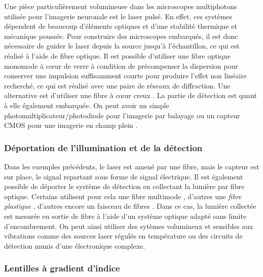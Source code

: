 Une pièce particulièrement volumineuse dans les microscopes multiphotons utilisée pour l'imagerie neuronale est le laser pulsé. En effet, ces systèmes dépendent de beaucoup d'éléments optiques et d'une stabilité thermique et mécanique poussée. Pour construire des microscopes embarqués, il est donc nécessaire de guider le laser depuis la source jusqu'à l'échantillon, ce qui est réalisé à l'aide de fibre optique. Il est possible d'utiliser une fibre optique monomode à cœur de verre \cite{helmchen_miniature_2001} \cite{sawinski_visually_2009} \cite{zong_fast_2017} à condition de précompenser la dispersion pour conserver une impulsion suffisamment courte pour produire l'effet non linéaire recherché, ce qui est réalisé avec une paire de réseaux de diffraction. Une alternative est d'utiliser une fibre à cœur creux \cite{tai_two-photon_2004} \cite{choi_improving_2014} \cite{piyawattanametha_vivo_2009} \cite{klioutchnikov_three-photon_2020}.
La partie de détection est quant à elle également embarquée. On peut avoir un simple photomultiplicateur/photodiode pour l'imagerie par balayage \cite{helmchen_miniature_2001} ou un capteur CMOS pour une imagerie en champ plein \cite{scott_imaging_2018}.

\subsubsection{Déportation de l'illumination et de la détection}

Dans les exemples précédents, le laser est amené par une fibre, mais le capteur est sur place, le signal repartant sous forme de signal électrique. Il est également possible de déporter le système de détection en collectant la lumière par fibre optique. Certains utilisent pour cela une fibre multimode \cite{piyawattanametha_vivo_2009} \cite{sawinski_visually_2009}, d'autres une \emph{fibre plastique} \cite{klioutchnikov_three-photon_2020}, d'autres encore un faisceau de fibres \cite{zong_fast_2017}. Dans ce cas, la lumière collectée est mesurée en sortie de fibre à l'aide d'un système optique adapté sans limite d'encombrement. On peut ainsi utiliser des sytèmes volumineux et sensibles aux vibrations comme des sources laser régulés en température ou des circuits de détection munis d'une électronique complexe.

\subsubsection{Lentilles à gradient d'indice}

